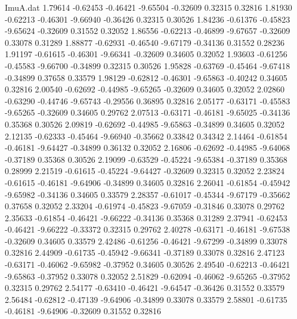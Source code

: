 \begin{filecontents}{ImuA.dat}
   1.79614   -0.62453   -0.46421   -9.65504   -0.32609    0.32315    0.32816
   1.81930   -0.62213   -0.46301   -9.66940   -0.36426    0.32315    0.30526
   1.84236   -0.61376   -0.45823   -9.65624   -0.32609    0.31552    0.32052
   1.86556   -0.62213   -0.46899   -9.67657   -0.32609    0.33078    0.31289
   1.88877   -0.62931   -0.46540   -9.67179   -0.34136    0.31552    0.28236
   1.91197   -0.61615   -0.46301   -9.66341   -0.32609    0.34605    0.32052
   1.93603   -0.61256   -0.45583   -9.66700   -0.34899    0.32315    0.30526
   1.95828   -0.63769   -0.45464   -9.67418   -0.34899    0.37658    0.33579
   1.98129   -0.62812   -0.46301   -9.65863   -0.40242    0.34605    0.32816
   2.00540   -0.62692   -0.44985   -9.65265   -0.32609    0.34605    0.32052
   2.02860   -0.63290   -0.44746   -9.65743   -0.29556    0.36895    0.32816
   2.05177   -0.63171   -0.45583   -9.65265   -0.32609    0.34605    0.29762
   2.07513   -0.63171   -0.46181   -9.65025   -0.34136    0.35368    0.30526
   2.09819   -0.62692   -0.44985   -9.65863   -0.34899    0.34605    0.32052
   2.12135   -0.62333   -0.45464   -9.66940   -0.35662    0.33842    0.34342
   2.14464   -0.61854   -0.46181   -9.64427   -0.34899    0.36132    0.32052
   2.16806   -0.62692   -0.44985   -9.64068   -0.37189    0.35368    0.30526
   2.19099   -0.63529   -0.45224   -9.65384   -0.37189    0.35368    0.28999
   2.21519   -0.61615   -0.45224   -9.64427   -0.32609    0.32315    0.32052
   2.23824   -0.61615   -0.46181   -9.64906   -0.34899    0.34605    0.32816
   2.26041   -0.61854   -0.45942   -9.65982   -0.34136    0.34605    0.33579
   2.28357   -0.61017   -0.45344   -9.67179   -0.35662    0.37658    0.32052
   2.33204   -0.61974   -0.45823   -9.67059   -0.31846    0.33078    0.29762
   2.35633   -0.61854   -0.46421   -9.66222   -0.34136    0.35368    0.31289
   2.37941   -0.62453   -0.46421   -9.66222   -0.33372    0.32315    0.29762
   2.40278   -0.63171   -0.46181   -9.67538   -0.32609    0.34605    0.33579
   2.42486   -0.61256   -0.46421   -9.67299   -0.34899    0.33078    0.32816
   2.44909   -0.61735   -0.45942   -9.66341   -0.37189    0.33078    0.32816
   2.47123   -0.63171   -0.46062   -9.65982   -0.37952    0.34605    0.30526
   2.49540   -0.62213   -0.46421   -9.65863   -0.37952    0.33078    0.32052
   2.51829   -0.62094   -0.46062   -9.65265   -0.37952    0.32315    0.29762
   2.54177   -0.63410   -0.46421   -9.64547   -0.36426    0.31552    0.33579
   2.56484   -0.62812   -0.47139   -9.64906   -0.34899    0.33078    0.33579
   2.58801   -0.61735   -0.46181   -9.64906   -0.32609    0.31552    0.32816

\end{filecontents}
